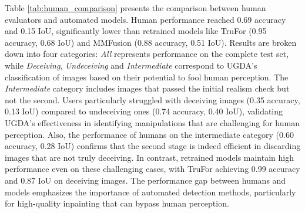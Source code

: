 Table \ref{tab:human_comparison} presents the comparison between human evaluators and automated models. Human performance reached 0.69 accuracy and 0.15 IoU, significantly lower than retrained models like TruFor (0.95 accuracy, 0.68 IoU) and MMFusion (0.88 accuracy, 0.51 IoU). Results are broken down into four categories: \textit{All} represents performance on the complete test set, while \textit{Deceiving}, \textit{Undeceiving} and \textit{Intermediate} correspond to UGDA's classification of images based on their potential to fool human perception. The \textit{Intermediate} category includes images that passed the initial realism check but not the second. Users particularly struggled with deceiving images (0.35 accuracy, 0.13 IoU) compared to undeceiving ones (0.74 accuracy, 0.40 IoU), validating UGDA's effectiveness in identifying manipulations that are challenging for human perception. Also, the performance of humans on the intermediate category (0.60 accuracy, 0.28 IoU) confirms that the second stage is indeed efficient in discarding images that are not truly deceiving. In contrast, retrained models maintain high performance even on these challenging cases, with TruFor achieving 0.99 accuracy and 0.87 IoU on deceiving images. The performance gap between humans and models emphasizes the importance of automated detection methods, particularly for high-quality inpainting that can bypass human perception.
\vspace{-14pt} 
